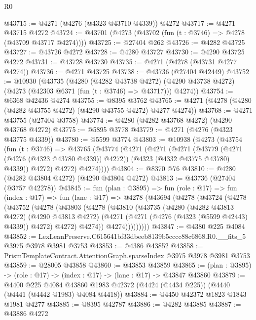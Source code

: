 \begin{lexlean}{R0}
\begin{coremodule}
@43715 := @4271 (@4276 (@4323 @43710 @4339)) @4272
@43717 := @4271 @43715 @4272
@43724 := @43701 (@4273 (@43702 (fun (t : @3746) => @4278 (@43709 @43717 @4274))))
@43725 := @27404 @262
@43726 := @4282 @43725
@43727 := @43726 @4272
@43728 := @4280 @43727
@43730 := @4290 @43725 @4272
@43731 := @43728 @43730
@43735 := @4271 (@4278 (@43731 @4277 @4274))
@43736 := @4271 @43725
@43738 := @43736 (@27404 @42449)
@43752 := @10930
    (@43735
      (@4280
        (@4282 @43738 @4272)
        (@4290 @43738 @4272)
        (@4273 (@42303 @6371 (fun (t : @3746) => @43717)))
        @4274))
@43754 := @6368 @42436 @4274
@43755 := @8395 @3762
@43765 := @4271 (@4278 (@4280 (@4282 @43755 @4272) (@4290 @43755 @4272) @4277 @4274))
@43768 := @4271 @43755 (@27404 @3758)
@43774 := @4280 (@4282 @43768 @4272) (@4290 @43768 @4272)
@43775 := @5895 @3778
@43779 := @4271 (@4276 (@4323 @43775 @4339))
@43780 := @5599 @3774
@43803 := @10938
    (@4273
      (@43754
        (fun (t : @3746) =>
        @43765
          (@43774
            (@4271
              (@4271
                (@4271
                  (@43779 (@4271 (@4276 (@4323 @43780 @4339)) @4272))
                  (@4323 (@4332 @43775 @43780) @4339))
                @4272)
              @4272)
            @4274))))
@43804 := @8370 @76
@43810 := @4280 (@4282 @43804 @4272) (@4290 @43804 @4272)
@43813 := @43736 (@27404 (@3757 @42278))
@43845 := fun (plan : @3895) =>
  fun (role : @17) =>
  fun (index : @17) =>
  fun (lane : @17) =>
  @4278
    (@43694
      (@4278
        (@43724
          (@4278
            (@43752
              (@4278
                (@43803
                  (@4278
                    (@43810
                      (@43735
                        (@4280
                          (@4282 @43813 @4272)
                          (@4290 @43813 @4272)
                          (@4271 (@4271 (@4276 (@4323 (@5599 @42443) @4339)) @4272) @4272)
                          @4274))
                      @4274)))))))))
@43847 := @4380 @225 @4084
@43852 := LexLeanPreserve.C615641bf33dbeeb8139b5cccc88c6868.R0.__fits_5 @3975 @3978 @3981 @3753
@43853 := @4386 @43852
@43858 := PrismTemplateContract.AttentionGraph.sparseIndex @3975 @3978 @3981 @3753
@43859 := @28005 @43858
@43860 := @43853 @43859
@43865 := (plan : @3895) -> (role : @17) -> (index : @17) -> (lane : @17) -> @43847 @43860
@43879 := @4400
    @225
    @4084
    @43860
    @1983
    @42372
    (@4424 (@4434 @225))
    (@4440 (@4441 (@4442 @1983) @4084 @4418))
@43884 := @4450 @42372 @1823 @1843 @1981 @4277
@43885 := @8395 @42787
@43886 := @4282 @43885
@43887 := @43886 @4272

\end{coremodule}
\end{lexlean}
